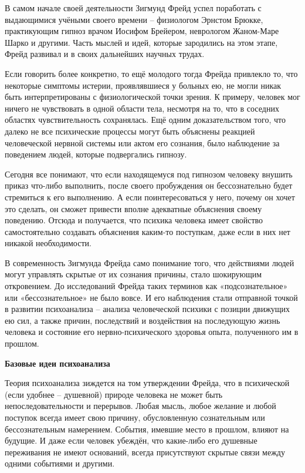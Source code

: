 В самом начале своей деятельности Зигмунд Фрейд успел поработать с выдающимися учёными своего времени – физиологом Эрнстом Брюкке, практикующим гипноз врачом Иосифом Брейером, неврологом Жаном-Маре Шарко и другими. Часть мыслей и идей, которые зародились на этом этапе, Фрейд развивал и в своих дальнейших научных трудах.

Если говорить более конкретно, то ещё молодого тогда Фрейда привлекло то, что некоторые симптомы истерии, проявлявшиеся у больных ею, не могли никак быть интерпретированы с физиологической точки зрения. К примеру, человек мог ничего не чувствовать в одной области тела, несмотря на то, что в соседних областях чувствительность сохранялась. Ещё одним доказательством того, что далеко не все психические процессы могут быть объяснены реакцией человеческой нервной системы или актом его сознания, было наблюдение за поведением людей, которые подвергались гипнозу.

Сегодня все понимают, что если находящемуся под гипнозом человеку внушить приказ что-либо выполнить, после своего пробуждения он бессознательно будет стремиться к его выполнению. А если поинтересоваться у него, почему он хочет это сделать, он сможет привести вполне адекватные объяснения своему поведению. Отсюда и получается, что психика человека имеет свойство самостоятельно создавать объяснения каким-то поступкам, даже если в них нет никакой необходимости.

В современность Зигмунда Фрейда само понимание того, что действиями людей могут управлять скрытые от их сознания причины, стало шокирующим откровением. До исследований Фрейда таких терминов как «подсознательное» или «бессознательное» не было вовсе. И его наблюдения стали отправной точкой в развитии психоанализа – анализа человеческой психики с позиции движущих ею сил, а также причин, последствий и воздействия на последующую жизнь человека и состояние его нервно-психического здоровья опыта, полученного им в прошлом.

\textbf{Базовые идеи психоанализа}

Теория психоанализа зиждется на том утверждении Фрейда, что в психической (если удобнее – душевной) природе человека не может быть непоследовательности и перерывов. Любая мысль, любое желание и любой поступок всегда имеет свою причину, обусловленную сознательным или бессознательным намерением. События, имевшие место в прошлом, влияют на будущие. И даже если человек убеждён, что какие-либо его душевные переживания не имеют оснований, всегда присутствуют скрытые связи между одними событиями и другими.

